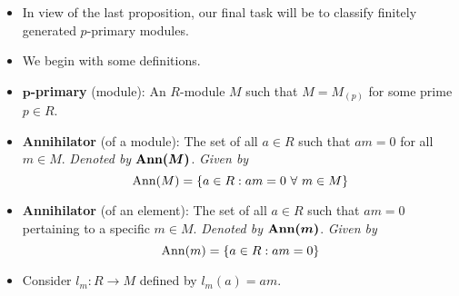 \documentclass[../notes.tex]{subfiles}
\begin{document}
\begin{itemize}
\begin{proof}
        \begin{equation*}
            m_1 = 1\cdot m_1
            = (ba+cp_1^{k_1})m_1
            = b(am_1)+c(p_1^{k_1}m_1)
            = b(0)+c(0)
            = 0
        \end{equation*}
        A symmetric argument shows that all $m_i=0$, i.e., $(m_1,\dots,m_r)=(0,\dots,0)$. Therefore, $\ker(T)=0$, as desired.\par
        We now prove that $T$ is surjective. Let $m\in\Tor(M)$ be arbitrary. Consider the submodule $N=Am\subset M$. To prove that $m$ is the sum of elements, each from a $p$-primary component of $M$, it will suffice to prove that stronger condition that every element in $N$ is the sum of elements, each from a $p$-primary component of $M$. Equivalently, it will suffice to show that $N$ is the isomorphic to the sum of its $p$-primary components, since the $p$-primary components of $N$ are contained in those of $M$. Define $I=\{a\in R:am=0\}$. Notice that $I=\ker(l_a)$, where $l_a:R\to N$ is the left multiplication homomorphism. It follows by the FIT that there exists an isomorphism $\overline{l_a}:R/I\to N$. Thus, we need only show that $R/I$ is isomorphic to the direct sum of its $p$-primary components. But the \hyperref[trm:7.17]{Chinese Remainder Theorem} takes care of this for us since $I$ is a nonzero ideal.
    \end{proof}
    \item In view of the last proposition, our final task will be to classify finitely generated $p$-primary modules.
    \item We begin with some definitions.
    \item \textbf{$\bm{p}$-primary} (module): An $R$-module $M$ such that $M=M_{(p)}$ for some prime $p\in R$.
    \item \textbf{Annihilator} (of a module): The set of all $a\in R$ such that $am=0$ for all $m\in M$. \emph{Denoted by} $\bm{\Ann(M)}$. \emph{Given by}
    \begin{equation*}
        \Ann(M) = \{a\in R:am=0\ \forall\ m\in M\}
    \end{equation*}
    \item \textbf{Annihilator} (of an element): The set of all $a\in R$ such that $am=0$ pertaining to a specific $m\in M$. \emph{Denoted by} $\bm{\Ann(m)}$. \emph{Given by}
    \begin{equation*}
        \operatorname{Ann}(m) = \{a\in R:am=0\}
    \end{equation*}
    \item Consider $l_m:R\to M$ defined by $l_m(a)=am$.

\end{itemize}
\end{document}
